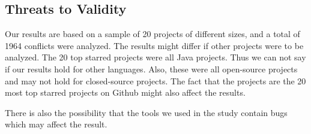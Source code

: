 \subsection{Threats to Validity}
Our results are based on a sample of 20 projects of different sizes, and a total of 1964 conflicts were analyzed. The results might differ if other projects were to be analyzed. The 20 top starred projects were all Java projects. Thus we can not say if our results hold for other languages. Also, these were all open-source projects and may not hold for closed-source projects. The fact that the projects are the 20 most top starred projects on Github might also affect the results.

There is also the possibility that the tools we used in the study contain bugs which may affect the result.
